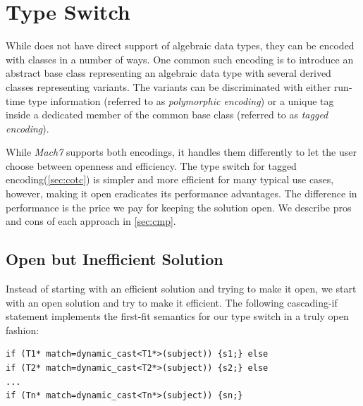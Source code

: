 \section{Type Switch}
\label{sec:copc}

While \Cpp{} does not have direct support of algebraic data types, they can be 
encoded with classes in a number of ways. One common such encoding is to 
introduce an abstract base class representing an algebraic data type with 
several derived classes representing variants. The variants can be 
discriminated with either run-time type information (referred to as 
\emph{polymorphic encoding}) or a unique tag inside a dedicated member of the 
common base class (referred to  as \emph{tagged encoding}).

While \emph{Mach7} supports both encodings, it handles them differently to let 
the user choose between openness and efficiency. The type switch for tagged 
encoding(\textsection\ref{sec:cotc}) is simpler and more efficient for many typical use cases, however, 
making it open eradicates its performance advantages. The difference in 
performance is the price we pay for keeping the solution open. We describe pros 
and cons of each approach in \textsection\ref{sec:cmp}.




\subsection{Open but Inefficient Solution}
\label{sec:poets}

Instead of starting with an efficient solution and trying to make it open, we 
start with an open solution and try to make it efficient. The following 
cascading-if statement implements the first-fit semantics for our type switch in 
a truly open fashion:

\begin{lstlisting}
if (T1* match=dynamic_cast<T1*>(subject)) {s1;} else
if (T2* match=dynamic_cast<T2*>(subject)) {s2;} else
...
if (Tn* match=dynamic_cast<Tn*>(subject)) {sn;}
\end{lstlisting}

